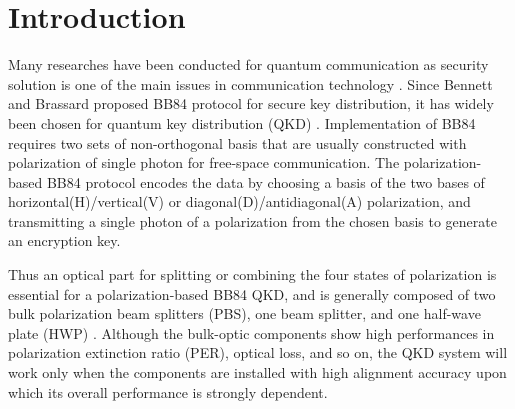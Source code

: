 \documentclass[letterpaper, 10pt]{article}
\begin{document}
\section{Introduction}
Many researches have been conducted for quantum communication as security solution is one of the main issues in communication technology \cite{Bennett:1984is, Ekert:1991kl}.
Since Bennett and Brassard proposed BB84 protocol for secure key distribution, it has widely been chosen for quantum key distribution (QKD) \cite{Bennett:1984is}.
Implementation of BB84 requires two sets of non-orthogonal basis %
that are usually constructed with polarization of single photon for free-space communication.
The polarization-based BB84 protocol encodes the data by choosing a basis of the two bases of horizontal(H)/vertical(V) or diagonal(D)/antidiagonal(A) polarization, and transmitting a single photon of a polarization from the chosen basis to generate an encryption key.

Thus an optical part for splitting or combining the four states of polarization is essential for a polarization-based BB84 QKD, and is generally composed of two bulk polarization beam splitters (PBS), one beam splitter, and one half-wave plate (HWP) \cite{Ko:2017cs}.
Although the bulk-optic components show high performances in polarization extinction ratio (PER), optical loss, and so on, the QKD system will work only when the components are installed with high alignment accuracy upon which its overall performance is strongly dependent.
\end{document}
